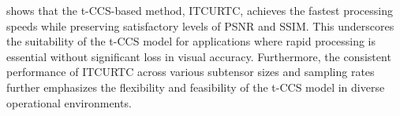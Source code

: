 \documentclass[twoside,12pt]{article}
\begin{document}
 
 shows that the t-CCS-based method, ITCURTC, achieves the fastest processing speeds while preserving satisfactory levels of PSNR and SSIM. This underscores the suitability of the t-CCS model for applications where rapid processing is essential without significant loss in visual accuracy. Furthermore, the consistent performance of ITCURTC across various subtensor sizes and sampling rates further emphasizes the flexibility and feasibility of the t-CCS model in diverse operational environments.
\end{document}
